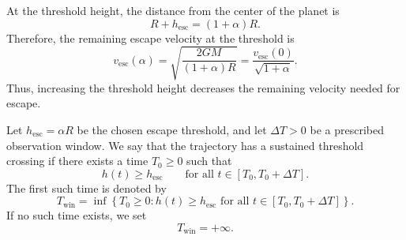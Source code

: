 At the threshold height, the distance from the center of the planet is
\[
    \boxed{ R+h_{\mathrm{esc}}=(1+\alpha)R. }
\]
Therefore, the remaining escape velocity at the threshold is
\[
    \boxed{ v_{\mathrm{esc}}(\alpha) = \sqrt{ \frac{2GM}{(1+\alpha)R} } = \frac{v_{\mathrm{esc}}(0)}{\sqrt{1+\alpha}}. }
\]
Thus, increasing the threshold height decreases the remaining velocity needed for escape.
\begin{definition}
Let $h_{\mathrm{esc}}=\alpha R$ be the chosen escape threshold, and let $\Delta T>0$ be a prescribed observation window. 
We say that the trajectory has a sustained threshold crossing if there exists a time $T_0\geq 0$ such that
\[
    h(t)\geq h_{\mathrm{esc}} \qquad \text{for all }t\in[T_0,T_0+\Delta T].
\]
The first such time is denoted by
\[
    T_{\mathrm{win}} = \inf \left\{ T_0\geq 0: h(t)\geq h_{\mathrm{esc}} \text{ for all }t\in[T_0,T_0+\Delta T] \right\}.
\]
If no such time exists, we set
\[
    T_{\mathrm{win}}=+\infty.
\]
\end{definition}
